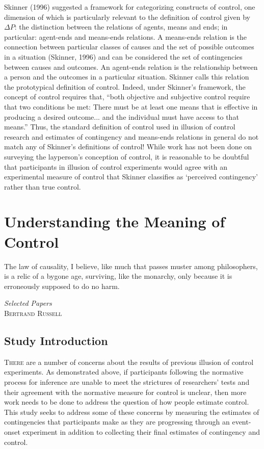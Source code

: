 \documentclass[USenglish,letterpaper,12pt,extrafontsizes,oneside,onecolumn,final]{memoir}
\begin{document}
Skinner (1996) suggested a framework for categorizing constructs of control, one dimension of which is particularly relevant to the definition of control given by $\Delta P$: the distinction between the relations of agents, means and ends; in particular: agent-ends and means-ends relations.  A means-ends relation is the connection between particular classes of causes and the set of possible outcomes in a situation (Skinner, 1996) and can be considered the set of contingencies between causes and outcomes. An agent-ends relation is the relationship between a person and the outcomes in a particular situation. Skinner calls this relation the prototypical definition of control. Indeed, under Skinner's framework, the concept of control requires that, ``both objective and subjective control require that two conditions be met: There must be at least one means that is effective in producing a desired outcome... and the individual must have access to that means.'' Thus, the standard definition of control used in illusion of control research and estimates of contingency and means-ends relations in general do not match any of Skinner's definitions of control!  While work has not been done  on surveying the layperson's conception of control, it is reasonable to be doubtful that participants in illusion of control experiments would agree with an experimental measure of control that Skinner classifies as `perceived contingency' rather than true control.

\chapter{Understanding the Meaning of Control}
\label{chap:bioc}

\epigraph{\SingleSpacing The law of causality, I believe, like much that passes muster among philosophers, is a relic of a bygone age, surviving, like the monarchy, only because it is erroneously supposed to do no harm.}{\textit{Selected Papers}\\ \textsc{Bertrand Russell}}

\section{Study Introduction}
\lettrine[lines=2,slope=-3pt,nindent=2pt]{T}{here} are a number of concerns about the results of previous illusion of control experiments.  As demonstrated above, if participants following the normative process for inference are unable to meet the strictures of researchers' tests and their agreement with the normative measure for control is unclear, then more work needs to be done to address the question of how people estimate control.
This study seeks to address some of these concerns by measuring the estimates of contingencies that participants make as they are progressing through an event-onset experiment in addition to collecting their final estimates of contingency and control.  
\end{document}
